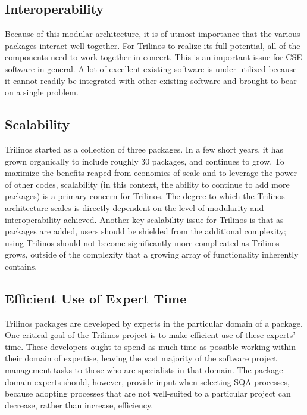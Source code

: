\documentclass[times,10pt,twocolumn]{article}
\begin{document}
\subsection{Interoperability}
Because of this modular architecture, it is of utmost importance
that the various packages interact well together.  For Trilinos to
realize its full potential, all of the components need to work
together in concert.  This is an important issue for CSE software in
general.  A lot of excellent existing software is under-utilized
because it cannot readily be integrated with other existing software
and brought to bear on a single problem.

\subsection{Scalability}
Trilinos started as a collection of three packages.  In a few short
years, it has grown organically to include roughly 30 packages, and
continues to grow. To maximize the benefits reaped from economies of
scale and to leverage the power of other codes, scalability (in this
context, the ability to continue to add more packages) is a primary
concern for Trilinos. The degree to which the Trilinos architecture
scales is directly dependent on the level of modularity and
interoperability achieved. Another key scalability issue for
Trilinos is that as packages are added, users should be shielded
from the additional complexity; using Trilinos should not become
significantly more complicated as Trilinos grows, outside of the
complexity that a growing array of functionality inherently
contains.

\subsection{Efficient Use of Expert Time}
Trilinos packages are developed by experts in the particular domain
of a package.  One critical goal of the Trilinos project is to make
efficient use of these experts' time.  These developers ought to
spend as much time as possible working within their domain of
expertise, leaving the vast majority of the software project
management tasks to those who are specialists in that domain.  The
package domain experts should, however, provide input when selecting
SQA processes, because adopting processes that are not well-suited
to a particular project can decrease, rather than increase,
efficiency.
\end{document}
